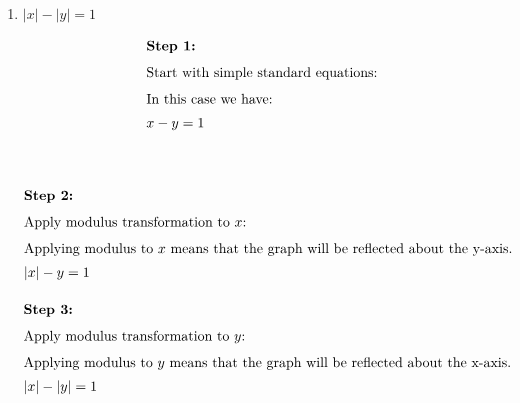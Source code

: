 \begin{enumerate}
    \item $|x|-|y|=1$
        \begin{multicols}{2}
            \begin{align*}
                \intertext{\textbf{Step 1:}}
                \intertext{Start with simple standard equations:}
                \intertext{In this case we have:}
                x - y &= 1\\[10mm]
            \end{align*}
            \begin{center}
            \end{center}
        \end{multicols}
        \begin{multicols}{2}
            \begin{align*}
                \intertext{\textbf{Step 2:}}
                \intertext{Apply modulus transformation to $x$:}
                \intertext{Applying modulus to $x$ means that the graph will be reflected about the y-axis.}
                |x| - y &= 1\\[1mm]
            \end{align*}
            \begin{center}
            \end{center}
        \end{multicols}
        \begin{multicols}{2}
            \begin{align*}
                \intertext{\textbf{Step 3:}}
                \intertext{Apply modulus transformation to $y$:}
                \intertext{Applying modulus to $y$ means that the graph will be reflected about the x-axis.}
                |x| - |y| &= 1\\[1mm]
            \end{align*}
            \begin{center}
\end{center}
\end{multicols}
\end{enumerate}
